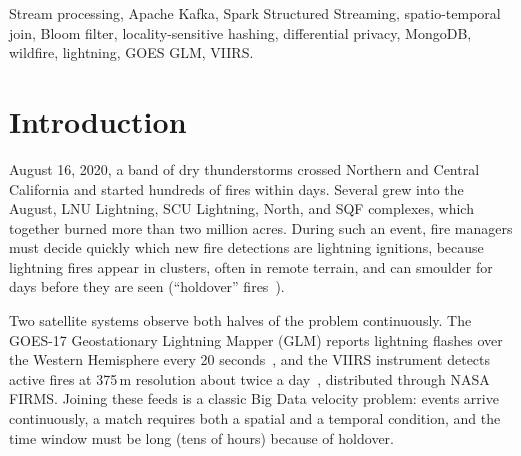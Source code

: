 \documentclass[10pt,journal,compsoc]{IEEEtran}
\begin{document}
{\begin{IEEEkeywords}
Stream processing, Apache Kafka, Spark Structured Streaming, spatio-temporal join, Bloom filter, locality-sensitive hashing, differential privacy, MongoDB, wildfire, lightning, GOES GLM, VIIRS.
\end{IEEEkeywords}}

\maketitle
\IEEEdisplaynontitleabstractindextext
\IEEEpeerreviewmaketitle

\section{Introduction}
 August 16, 2020, a band of dry thunderstorms crossed Northern and Central California and started hundreds of fires within days. Several grew into the August, LNU Lightning, SCU Lightning, North, and SQF complexes, which together burned more than two million acres. During such an event, fire managers must decide quickly which new fire detections are lightning ignitions, because lightning fires appear in clusters, often in remote terrain, and can smoulder for days before they are seen (``holdover'' fires~\cite{moris2023holdover,kalashnikov2023liw}).

Two satellite systems observe both halves of the problem continuously. The GOES-17 Geostationary Lightning Mapper (GLM) reports lightning flashes over the Western Hemisphere every 20 seconds~\cite{goodman2013glm}, and the VIIRS instrument detects active fires at 375\,m resolution about twice a day~\cite{schroeder2014viirs}, distributed through NASA FIRMS. Joining these feeds is a classic Big Data velocity problem: events arrive continuously, a match requires both a spatial and a temporal condition, and the time window must be long (tens of hours) because of holdover.
\end{document}
